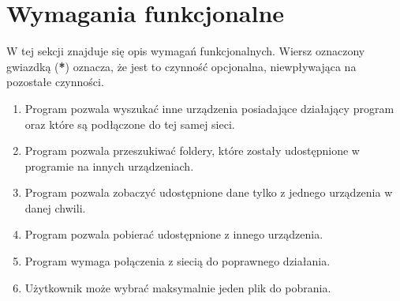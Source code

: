 \documentclass[12pt,a4paper]{article}
\begin{document}
\section{Wymagania funkcjonalne}
W tej sekcji znajduje się opis wymagań funkcjonalnych. Wiersz oznaczony gwiazdką (\textbf{*}) oznacza, że jest to czynność opcjonalna, niewpływająca na pozostałe czynności.

\begin{enumerate}
	\item Program pozwala wyszukać inne urządzenia posiadające działający program oraz które są podłączone do tej samej sieci.
	\item Program pozwala przeszukiwać foldery, które zostały udostępnione w programie na innych urządzeniach.
	\item Program pozwala zobaczyć udostępnione dane tylko z jednego urządzenia w danej chwili.
	\item Program pozwala pobierać udostępnione z innego urządzenia.
	\item Program wymaga połączenia z siecią do poprawnego działania.
	\item Użytkownik może wybrać maksymalnie jeden plik do pobrania.
\end{enumerate}
\end{document}
